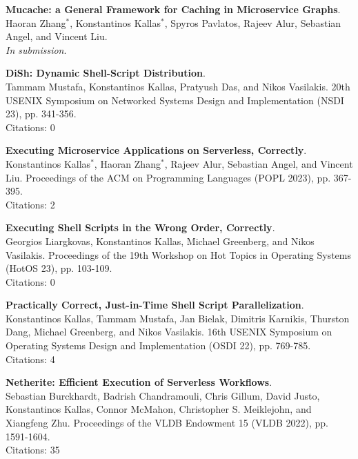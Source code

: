 \begin{minipage}{\textwidth}
\textbf{Mucache: a General Framework for Caching in Microservice Graphs}. \\
Haoran Zhang$^*$, Konstantinos Kallas$^*$, Spyros Pavlatos, Rajeev Alur, Sebastian Angel, and Vincent Liu. \\
\emph{In submission}.
\end{minipage}

\begin{minipage}{\textwidth}
\textbf{DiSh: Dynamic Shell-Script Distribution}. \\
Tammam Mustafa, Konstantinos Kallas, Pratyush Das, and Nikos Vasilakis.
20th USENIX Symposium on Networked Systems Design and Implementation (NSDI 23), pp. 341-356. \\
Citations: 0
\end{minipage}

\begin{minipage}{\textwidth}
\textbf{Executing Microservice Applications on Serverless, Correctly}. \\
Konstantinos Kallas$^*$, Haoran Zhang$^*$, Rajeev Alur, Sebastian Angel, and Vincent Liu.
Proceedings of the ACM on Programming Languages (POPL 2023), pp. 367-395. \\
Citations: 2
\end{minipage}

\begin{minipage}{\textwidth}
\textbf{Executing Shell Scripts in the Wrong Order, Correctly}. \\
Georgios Liargkovas, Konstantinos Kallas, Michael Greenberg, and Nikos Vasilakis.
Proceedings of the 19th Workshop on Hot Topics in Operating Systems (HotOS 23), pp. 103-109. \\
Citations: 0
\end{minipage}

\begin{minipage}{\textwidth}
\textbf{Practically Correct, Just-in-Time Shell Script Parallelization}. \\
Konstantinos Kallas, Tammam Mustafa, Jan Bielak, Dimitris Karnikis, Thurston Dang, Michael Greenberg, and Nikos Vasilakis.
16th USENIX Symposium on Operating Systems Design and Implementation (OSDI 22), pp. 769-785. \\
Citations: 4
\end{minipage}

\begin{minipage}{\textwidth}
\textbf{Netherite: Efficient Execution of Serverless Workflows}. \\
Sebastian Burckhardt, Badrish Chandramouli, Chris Gillum, David Justo, Konstantinos Kallas, Connor McMahon, Christopher S. Meiklejohn, and Xiangfeng Zhu.
Proceedings of the VLDB Endowment 15 (VLDB 2022), pp. 1591-1604. \\
Citations: 35
\end{minipage}

